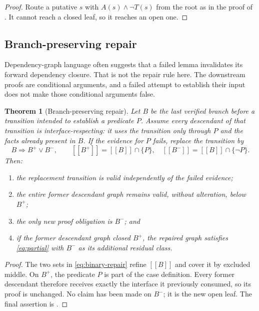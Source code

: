 \documentclass[11pt,reqno]{amsart}
\theoremstyle{plain}
\newtheorem{theorem}{Theorem}[section]
\theoremstyle{definition}
\theoremstyle{remark}
\numberwithin{equation}{section}
\newcommand{\sem}[1]{[\![#1]\!]}
\begin{document}
\begin{proof}
Route a putative \(s\) with \(A(s)\wedge\neg T(s)\) from the root as in the
proof of .  It cannot reach a closed leaf, so it reaches an
open one.
\end{proof}

\subsection{Branch-preserving repair}

Dependency-graph language often suggests that a failed lemma invalidates its
forward dependency closure.  That is not the repair rule here.  The downstream
proofs are conditional arguments, and a failed attempt to establish their
input does not make those conditional arguments false.

\begin{theorem}[Branch-preserving repair]\label{thm:repair}
Let \(B\) be the last verified branch before a transition intended to establish
a predicate \(P\).  Assume every descendant of that transition is
interface-respecting: it uses the transition only through \(P\) and the facts
already present in \(B\).  If the evidence for \(P\) fails, replace the
transition by
\begin{equation}\label{eq:binary-repair}
  B\Longrightarrow B^+\vee B^- ,
  \qquad
  \sem{B^+}=\sem B\cap\{P\},
  \quad
  \sem{B^-}=\sem B\cap\{\neg P\}.
\end{equation}
Then:
\begin{enumerate}
  \item the replacement transition is valid independently of the failed
  evidence;
  \item the entire former descendant graph remains valid, without alteration,
  below \(B^+\);
  \item the only new proof obligation is \(B^-\); and
  \item if the former descendant graph closed \(B^+\), the repaired graph
  satisfies \eqref{eq:partial} with \(B^-\) as its additional residual class.
\end{enumerate}
\end{theorem}

\begin{proof}
The two sets in \eqref{eq:binary-repair} refine \(\sem B\) and cover it by
excluded middle.  On \(B^+\), the predicate \(P\) is part of the case
definition.  Every former descendant therefore receives exactly the interface
it previously consumed, so its proof is unchanged.  No claim has been made on
\(B^-\); it is the new open leaf.  The final assertion is
.
\end{proof}
\end{document}

